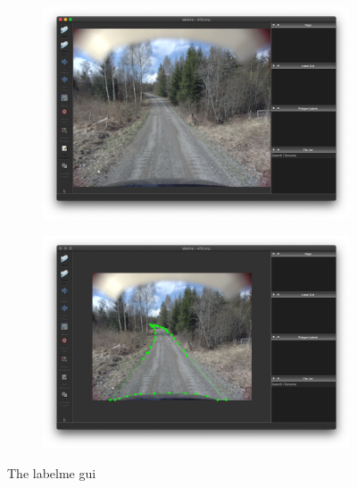 \documentclass[USenglish]{ifimaster}  %
\begin{document}
\begin{figure}[ht]
\begin{subfigure}{.6\textwidth}
\includegraphics[width=.75\linewidth]{bilder/labelme_gui.png}
\label{fig:gui}
\end{subfigure}
\hspace*{\fill} %
\begin{subfigure}{.6\textwidth}
\includegraphics[width=.75\linewidth]{bilder/annotating.png}
\label{fig:polygon}
\end{subfigure}
\caption{The labelme \ac{gui}}
\end{figure}
\end{document}
